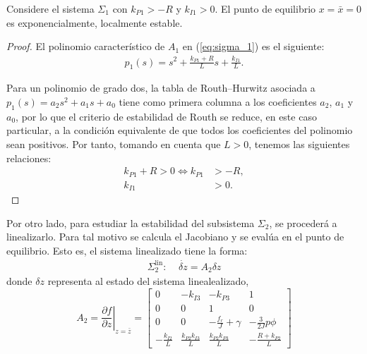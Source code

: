 \begin{lemma}\label{lem:sigma_1}
    Considere el sistema $\Sigma_1$ con $k_{P1}>-R$ y $k_{I1}>0$. El punto de equilibrio 
    $x=\bar x=0$ es exponencialmente, localmente estable.

    \tripletriang

    \begin{proof}
        El polinomio característico de $A_1$ en (\ref{eq:sigma_1}) es el siguiente:
        \begin{align}\label{p1}
            p_1(s)=s^2 + \frac{k_{P1}+R}{L}s + \frac{k_{I1}}{L}.
        \end{align}
    
        Para un polinomio de grado dos, la tabla de Routh--Hurwitz asociada a
        $p_1(s) = a_2 s^2 + a_1 s + a_0$ tiene como primera columna a los
        coeficientes $a_2$, $a_1$ y $a_0$, por lo que el criterio de estabilidad de
        Routh se reduce, en este caso particular, a la condición equivalente de que
        todos los coeficientes del polinomio sean positivos. Por tanto, tomando en
        cuenta que $L>0$, tenemos las siguientes relaciones:
        \begin{align}
            k_{P1} +R > 0  \Longleftrightarrow k_{P1} &> -R,\\
            k_{I1} &> 0.
        \end{align}
    \end{proof}
\end{lemma}


Por otro lado, para estudiar la estabilidad del subsistema $\Sigma_2$, se procederá a linealizarlo.
Para tal motivo se calcula el Jacobiano y se evalúa en  el punto de equilibrio. Esto es, el sistema 
linealizado tiene la forma:
\begin{align}\label{dz}
\Sigma_{2}^\mathrm{lin}:\;\;\;\;\dot{\delta z} =A_2 \delta z
\end{align}
donde $\delta z$ representa al estado del sistema linealealizado,  
\begin{equation}
A_2 = \left.\frac{\partial f}{\partial z}\right|_{z=\bar{z}} = \begin{bmatrix}
0 & -k_{I3} & -k_{P3} & 1 \\
0 & 0 & 1 & 0 \\
0 & 0 & -\frac{f_r}{J} + \gamma & -\frac{3}{2J}p\phi \\
-\frac{k_{I2}}{L} & \frac{k_{P2}k_{I3}}{L} & \frac{k_{P2}k_{P3}}{L} & -\frac{R+k_{P2}}{L}
\end{bmatrix} \label{eq:A2_symbolic}
\end{equation}

